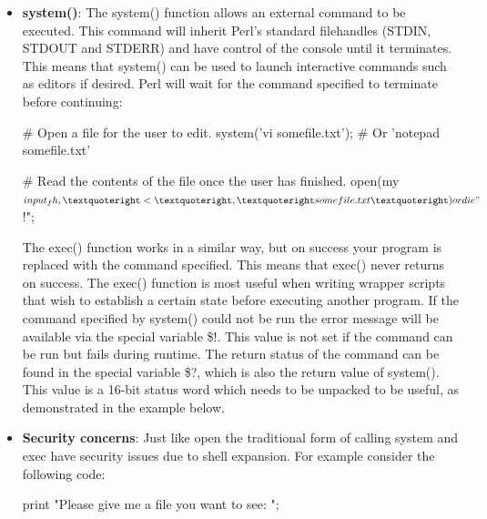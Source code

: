 \documentclass{report}
\begin{document}
    \pagebreak 
    \begin{itemize}
        \item \textbf{system()}: The system() function allows an external command to be executed. This command will inherit Perl’s standard filehandles (STDIN, STDOUT and STDERR) and have control of the console until it terminates. This means that system() can be used to launch interactive commands such as editors if desired. Perl will wait for the command specified to terminate before continuing:         
            \bigbreak \noindent 
            \begin{perlcode}
                # Open a file for the user to edit.
                system(’vi somefile.txt’); # Or ’notepad somefile.txt’

                # Read the contents of the file once the user has finished.
                open(my $input_fh, ’<’, ’somefile.txt’) or die "$!";
            \end{perlcode}
            \bigbreak \noindent 
            The exec() function works in a similar way, but on success your program is replaced with the command specified. This means that exec() never returns on success. The exec() function is most useful when writing wrapper scripts that wish to establish a certain state before executing another program.
            \bigbreak \noindent 
            If the command specified by system() could not be run the error message will be available via the special variable \$!. This value is not set if the command can be run but fails during runtime. The return status of the command can be found in the special variable \$?, which is also the return value of system(). This value is a 16-bit status word which needs to be unpacked to be useful, as demonstrated in the example below.
            \bigbreak \noindent 
        \item \textbf{Security concerns}: Just like open the traditional form of calling system and exec have security issues due to shell expansion. For example consider the following code:
            \bigbreak \noindent 
            \begin{perlcode}
                print "Please give me a file you want to see: ";


\end{perlcode}
\end{itemize}
\end{document}
